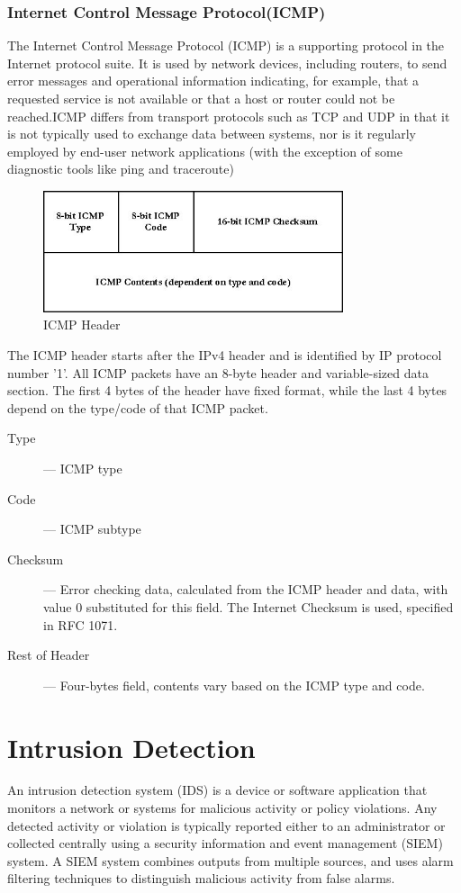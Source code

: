 \documentclass[12pt]{article}
\theoremstyle{definition}
\begin{document}
			\subsubsection{Internet Control Message Protocol(ICMP)}
			The Internet Control Message Protocol (ICMP) is a supporting protocol in the Internet protocol suite. It is used by network devices, including routers, to send error messages and operational information indicating, for example, that a requested service is not available or that a host or router could not be reached.ICMP differs from transport protocols such as TCP and UDP in that it is not typically used to exchange data between systems, nor is it regularly employed by end-user network applications (with the exception of some diagnostic tools like ping and traceroute)
			
			\begin{figure}[!h]
				\centering
				\includegraphics[width=250pt]{pictures/icmp_header.png}
				\caption{ICMP Header}
				\label{fig:icmp-header}
			\end{figure}
			The ICMP header starts after the IPv4 header and is identified by IP protocol number '1'. All ICMP packets have an 8-byte header and variable-sized data section. The first 4 bytes of the header have fixed format, while the last 4 bytes depend on the type/code of that ICMP packet.
			
			
			\begin{description}
				\item [Type ] --- ICMP type
				\item [Code ] --- ICMP subtype
				\item [Checksum] --- Error checking data, calculated from the ICMP header and data, with value 0 substituted for this field. The Internet Checksum is used, specified in RFC 1071.
				\item [Rest of Header] --- Four-bytes field, contents vary based on the ICMP type and code.
			\end{description}
			
	
	\cleardoublepage
	\section{Intrusion Detection}\label{sec:i-detection}
		An intrusion detection system (IDS) is a device or software application that monitors a network or systems for malicious activity or policy violations. Any detected activity or violation is typically reported either to an administrator or collected centrally using a security information and event management (SIEM) system. A SIEM system combines outputs from multiple sources, and uses alarm filtering techniques to distinguish malicious activity from false alarms.
		
\end{document}
